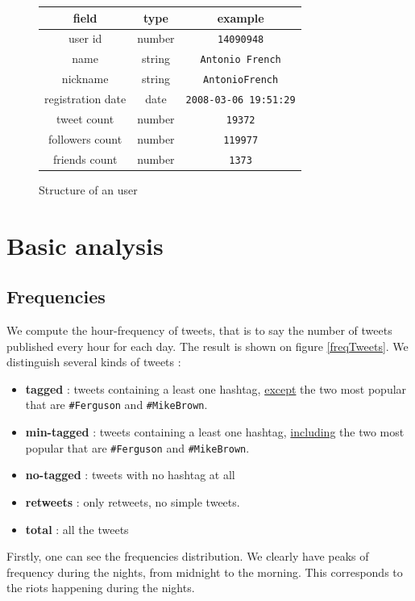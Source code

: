\documentclass[a4paper,twoside,12pt,openright]{report}
\begin{document}
\begin{figure}[h!]
\centering
\begin{tabular}{ccc}
field & type & example\\
\hline
\hline
user id & number & \texttt{14090948} \\ \hline
name & string & \texttt{Antonio French} \\ \hline
nickname & string & \texttt{AntonioFrench} \\ \hline
registration date & date & \texttt{2008-03-06 19:51:29} \\ \hline
tweet count & number & \texttt{19372} \\ \hline
followers count & number & \texttt{119977} \\ \hline
friends count & number & \texttt{1373} \\ \hline \hline
\end{tabular}
\caption{Structure of an user}
\label{structUser}
\end{figure}


\newpage

\section{Basic analysis}

\subsection{Frequencies}
\label{subSecFreqs}
We compute the hour-frequency of tweets, that is to say the number of tweets published every hour for each day. The result is shown on figure \ref{freqTweets}. We distinguish several kinds of tweets : 
\begin{itemize}
\item \textbf{tagged} : tweets containing a least one hashtag, \underline{except} the two most popular that are \texttt{\#Ferguson} and \texttt{\#MikeBrown}.
\item \textbf{min-tagged} : tweets containing a least one hashtag, \underline{including} the two most popular that are \texttt{\#Ferguson} and \texttt{\#MikeBrown}.
\item \textbf{no-tagged} : tweets with no hashtag at all
\item \textbf{retweets} : only retweets, no simple tweets.
\item \textbf{total} : all the tweets
\end{itemize}

Firstly, one can see the frequencies distribution. We clearly have peaks of frequency during the nights, from midnight to the morning. This corresponds to the riots happening during the nights.
\end{document}

